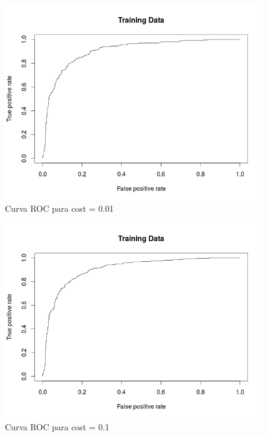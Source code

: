 \begin{figure}[H]
\centering
\includegraphics[scale=0.50]{ej1-32.png}
\caption{Curva ROC para cost = 0.01}
\label{}
\end{figure}

\begin{figure}[H]
\centering
\includegraphics[scale=0.50]{ej1-33.png}
\caption{Curva ROC para cost = 0.1}
\label{}
\end{figure}

